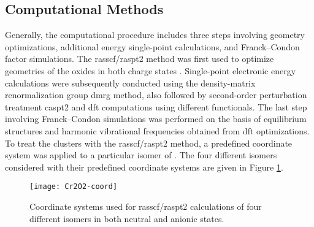 \begin{refsection}
\section{Computational Methods}


Generally, the computational procedure includes three steps involving geometry optimizations, additional energy single-point calculations, and Franck–Condon factor simulations. The \acrshort{rasscf}/\acrshort{raspt2} method was first used to optimize geometries of the oxides in both charge states . Single-point electronic energy calculations were subsequently conducted using the density-matrix renormalization group \acrshort{dmrg} method, also followed by second-order perturbation treatment \acrshort{caspt2} and \acrshort{dft} computations using different functionals. The last step involving Franck–Condon simulations was performed on the basis of equilibrium structures and harmonic vibrational frequencies obtained from \acrshort{dft} optimizations. To treat the  clusters with the \acrshort{rasscf}/\acrshort{raspt2} method, \cite{raspt2} a predefined coordinate system was applied to a particular isomer of . The four different isomers considered with their predefined coordinate systems are given in Figure \ref{c6fig:coord}.


\begin{figure}[htbp!]
	\centering
	\texttt{[image: Cr2O2-coord]}
	\caption{Coordinate systems used for \acrshort{rasscf}/\acrshort{raspt2} calculations of four different  isomers in both neutral and anionic states.}
	\label{c6fig:coord}
\end{figure}




\end{refsection}
